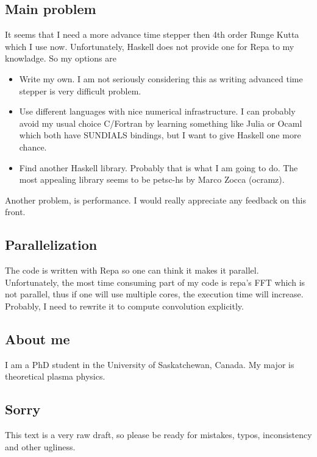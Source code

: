 \documentclass[preprint,aip,pop]{article}
\begin{document}
\subsection{Main problem}
It seems that I need a more advance time stepper then 4th order Runge Kutta
which I use now. Unfortunately, Haskell does not provide one for Repa to my
knowladge. So my options are
\begin{itemize}
\item Write my own. I am not seriously considering this as writing advanced
  time stepper is very difficult problem.
 \item Use different languages with nice numerical infrastructure. I can
   probably avoid my usual choice C/Fortran by learning something like Julia or
   Ocaml which both have SUNDIALS bindings, but I want to give Haskell one more chance.
 \item Find another Haskell library. Probably that is what I am going to do. The
   most appealing library seems to be petsc-hs by Marco Zocca (ocramz).
\end{itemize}
Another problem, is performance. I would really appreciate any feedback on this front.
\subsection{Parallelization}
The code is written with Repa so one can think it makes it parallel.
Unfortunately, the most time consuming part of my code is repa's FFT which is
not parallel, thus if one will use multiple cores, the execution time will increase.
Probably, I need to rewrite it to compute convolution explicitly.
\subsection{About me}
I am a PhD student in the University of Saskatchewan, Canada. My major is
theoretical plasma physics. 
\subsection{Sorry}
This text is a very raw draft, so please be ready for mistakes, typos,
inconsistency and other ugliness.
\end{document}
